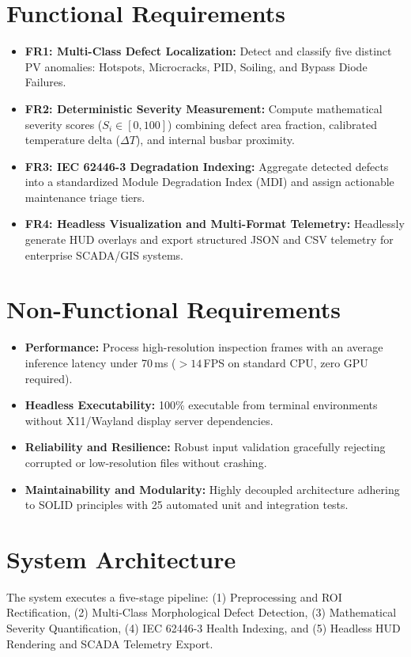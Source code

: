 \documentclass[11pt,a4paper]{article}
\begin{document}
\section{Functional Requirements}
\begin{itemize}
    \item \textbf{FR1: Multi-Class Defect Localization:} Detect and classify five distinct PV anomalies: Hotspots, Microcracks, PID, Soiling, and Bypass Diode Failures.
    \item \textbf{FR2: Deterministic Severity Measurement:} Compute mathematical severity scores ($S_i \in [0, 100]$) combining defect area fraction, calibrated temperature delta ($\Delta T$), and internal busbar proximity.
    \item \textbf{FR3: IEC 62446-3 Degradation Indexing:} Aggregate detected defects into a standardized Module Degradation Index (MDI) and assign actionable maintenance triage tiers.
    \item \textbf{FR4: Headless Visualization and Multi-Format Telemetry:} Headlessly generate HUD overlays and export structured JSON and CSV telemetry for enterprise SCADA/GIS systems.
\end{itemize}

\section{Non-Functional Requirements}
\begin{itemize}
    \item \textbf{Performance:} Process high-resolution inspection frames with an average inference latency under 70\,ms ($>14$\,FPS on standard CPU, zero GPU required).
    \item \textbf{Headless Executability:} 100\% executable from terminal environments without X11/Wayland display server dependencies.
    \item \textbf{Reliability and Resilience:} Robust input validation gracefully rejecting corrupted or low-resolution files without crashing.
    \item \textbf{Maintainability and Modularity:} Highly decoupled architecture adhering to SOLID principles with 25 automated unit and integration tests.
\end{itemize}

\section{System Architecture}
The system executes a five-stage pipeline: (1) Preprocessing and ROI Rectification, (2) Multi-Class Morphological Defect Detection, (3) Mathematical Severity Quantification, (4) IEC 62446-3 Health Indexing, and (5) Headless HUD Rendering and SCADA Telemetry Export.
\end{document}
